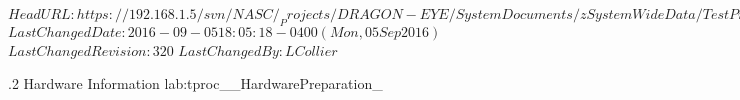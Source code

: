 \svnidlong
{$HeadURL: https://192.168.1.5/svn/NASC/_Projects/DRAGON-EYE/SystemDocuments/zSystemWideData/TestPrepProcs/TestCasePrep_HardwareInformation.tex $}
{$LastChangedDate: 2016-09-05 18:05:18 -0400 (Mon, 05 Sep 2016) $}
{$LastChangedRevision: 320 $}
{$LastChangedBy: LCollier $}

\TestProcedure  %
{\TestProcNumber.2}
{\StdTestNameX Hardware Information}
{lab:tproc_\StdTestName_HardwarePreparation_\TestProcNumber}
{
}
{
}
{
}
